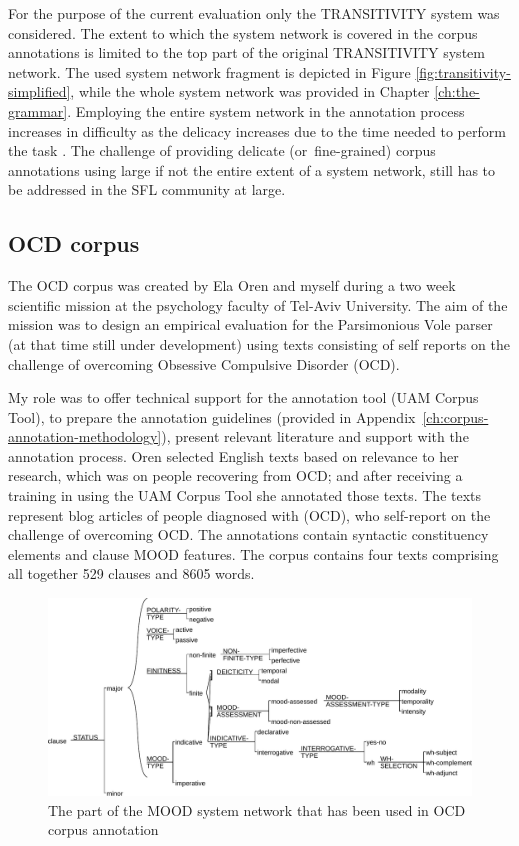     For the purpose of the current evaluation only the TRANSITIVITY system was considered. The extent to which the system network is covered in the corpus annotations is limited to the top part of the original TRANSITIVITY system network. The used system network fragment is depicted in Figure \ref{fig:transitivity-simplified}, while the whole system network was provided in Chapter \ref{ch:the-grammar}. Employing the entire system network in the annotation process increases in difficulty as the delicacy increases due to the time needed to perform the task \citep[33]{mcenery2006corpus}. The challenge of providing delicate \mbox{(or fine-grained)} corpus annotations using large if not the entire extent of a system network, still has to be addressed in the SFL community at large. 

\subsection{OCD corpus}

     The OCD corpus was created by Ela Oren and myself during a two week scientific mission at the psychology faculty of Tel-Aviv University. The aim of the mission was to design an empirical evaluation for the Parsimonious Vole parser (at that time still under development) using texts consisting of self reports on the challenge of overcoming Obsessive Compulsive Disorder (OCD).
     
     My role was to offer technical support for the annotation tool (UAM Corpus Tool), to prepare the annotation guidelines (provided in \mbox{Appendix \ref{ch:corpus-annotation-methodology}}), present relevant literature and support with the annotation process. Oren selected English texts based on relevance to her research, which was on people recovering from OCD; and after receiving a training in using the UAM Corpus Tool she annotated those texts. The texts represent blog articles of people diagnosed with (OCD), who self-report on the challenge of overcoming OCD. The annotations contain syntactic constituency elements and clause MOOD features. The corpus contains four texts comprising all together 529 clauses and 8605 words. 

    \begin{figure}[!h]
        \centering
        \includegraphics[width=.85\textwidth]{Figures/Evaluation/ocd1-mood-simplified.pdf}
        \caption{The part of the MOOD system network that has been used in OCD corpus annotation}
        \label{fig:mood-ocd-simplified}
    \end{figure}
    
